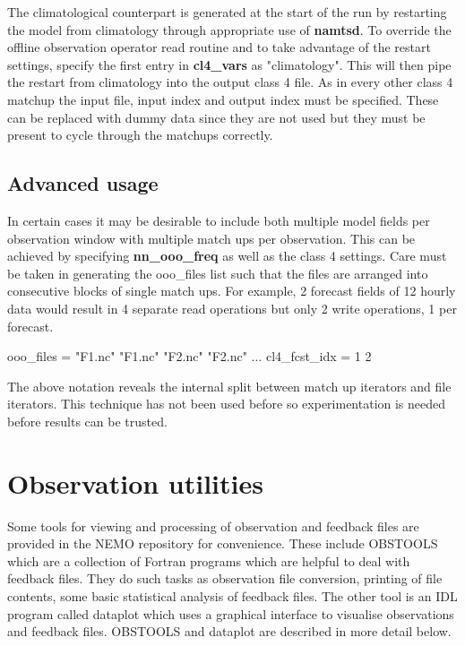 \documentclass[../main/NEMO_manual]{subfiles}
\begin{document}
The climatological counterpart is generated at the start of the run by
restarting the model from climatology through appropriate use of \textbf{namtsd}.
To override the offline observation operator read routine and to take advantage of the restart settings,
specify the first entry in \textbf{cl4\_vars} as "climatology".
This will then pipe the restart from climatology into the output class 4 file.
As in every other class 4 matchup the input file, input index and output index must be specified.
These can be replaced with dummy data since they are not used but
they must be present to cycle through the matchups correctly. 

\subsection{Advanced usage}

In certain cases it may be desirable to include both multiple model fields per observation window with
multiple match ups per observation.
This can be achieved by specifying \textbf{nn\_ooo\_freq} as well as the class 4 settings.
Care must be taken in generating the ooo\_files list such that the files are arranged into
consecutive blocks of single match ups.
For example, 2 forecast fields of 12 hourly data would result in 4 separate read operations but
only 2 write operations, 1 per forecast.

\begin{forlines}
   ooo_files = "F1.nc" "F1.nc" "F2.nc" "F2.nc"
...
   cl4_fcst_idx = 1 2
\end{forlines}

The above notation reveals the internal split between match up iterators and file iterators.
This technique has not been used before so experimentation is needed before results can be trusted.

\newpage

\section{Observation utilities}
\label{sec:OBS_obsutils}

Some tools for viewing and processing of observation and feedback files are provided in
the NEMO repository for convenience.
These include OBSTOOLS which are a collection of Fortran programs which are helpful to deal with feedback files.
They do such tasks as observation file conversion, printing of file contents,
some basic statistical analysis of feedback files.
The other tool is an IDL program called dataplot which uses a graphical interface to
visualise observations and feedback files.
OBSTOOLS and dataplot are described in more detail below.
\end{document}
